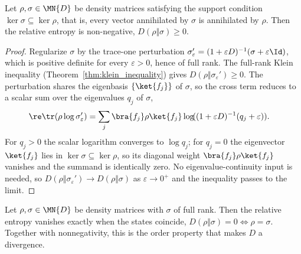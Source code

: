 \begin{theorem}\label{thm:klein_inequality_general}
    \leanok
    Let $\rho,\sigma\in\MN{D}$ be density matrices satisfying the support
    condition $\ker\sigma\subseteq\ker\rho$, that is, every vector annihilated by
    $\sigma$ is annihilated by $\rho$. Then the relative entropy is non-negative,
    $D(\rho\Vert\sigma)\ge0$.
\end{theorem}

\begin{proof}\leanok
    Regularize $\sigma$ by the trace-one perturbation
    $\sigma_\varepsilon'=(1+\varepsilon D)^{-1}(\sigma+\varepsilon\Id)$,
    which is positive definite for every $\varepsilon>0$, hence of full rank. The
    full-rank Klein inequality (Theorem~\ref{thm:klein_inequality}) gives
    $D(\rho\Vert\sigma_\varepsilon')\ge0$. The perturbation shares the
    eigenbasis $\{\ket{f_j}\}$ of $\sigma$, so the cross term reduces to a scalar
    sum over the eigenvalues $q_j$ of $\sigma$,
    \begin{align}
        \re\tr(\rho\log\sigma_\varepsilon')
         & =\sum_j\bra{f_j}\rho\ket{f_j}
        \log\!((1+\varepsilon D)^{-1}(q_j+\varepsilon)).
        \notag
    \end{align}
    For $q_j>0$ the scalar logarithm converges to $\log q_j$; for $q_j=0$ the
    eigenvector $\ket{f_j}$ lies in $\ker\sigma\subseteq\ker\rho$, so its diagonal
    weight $\bra{f_j}\rho\ket{f_j}$ vanishes and the summand is identically zero.
    No eigenvalue-continuity input is needed, so
    $D(\rho\Vert\sigma_\varepsilon')\to D(\rho\Vert\sigma)$ as
    $\varepsilon\to0^+$ and the inequality passes to the limit.
\end{proof}

\begin{theorem}
    \label{thm:klein_inequality_equality}
    \leanok
    Let $\rho,\sigma\in\MN{D}$ be density matrices with $\sigma$ of full rank.
    Then the relative entropy vanishes exactly when the states coincide,
    $D(\rho\Vert\sigma)=0\iff\rho=\sigma$.
    Together with nonnegativity, this is the order property that makes $D$ a
    divergence.
\end{theorem}

